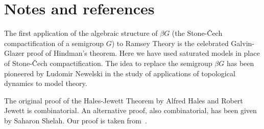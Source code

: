 \section{Notes and references}

The first application of the algebraic structure of $\beta G$ 
(the Stone-\v{C}ech compactification of a semigroup $G$) 
to Ramsey Theory is the celebrated Galvin-Glazer proof of Hindman's theorem. 
Here we have used saturated models in place of Stone-\v{C}ech compactification.
The idea to replace the semigroup $\beta G$  has been pioneered by Ludomir Newelski
in the study of applications of topological dynamics to model theory. 

The original proof of the Hales-Jewett Theorem by Alfred Hales and Robert Jewett is combinatorial.
An alternative proof, also combinatorial, has been given by Saharon Shelah.
Our proof is taken from~\cite{CZ}.

\begin{biblist}[]\normalsize
  \smallskip
  \end{biblist}

